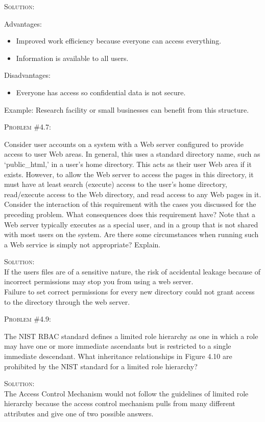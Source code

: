 \documentclass[12pt]{article}
\newenvironment{problem}[1]
{\begin{mdframed}[linewidth=0.8pt]
        \textsc{Problem #1:}

}
    {\end{mdframed}}
\newenvironment{solution}
    {\textsc{Solution:}\\}
    {\newpage}%
\begin{document}
\begin{solution}
\begin{enumerate}
				Advantages:
				\begin{itemize}
					\item Improved work efficiency because everyone can access everything.
					\item Information is available to all users.
				\end{itemize}
				Disadvantages:
				\begin{itemize}
					\item Everyone has access so confidential data is not secure.
				\end{itemize}
				Example: Research facility or small businesses can benefit from this structure.
		\end{enumerate}
	\end{solution}

	\begin{problem}{\#4.7}
		Consider user accounts on a system with a Web server configured to provide access
		to user Web areas. In general, this uses a standard directory name, such as
		`public\_html,' in a user's home directory. This acts as their user Web area if it
		exists. However, to allow the Web server to access the pages in this directory, it
		must have at least search (execute) access to the user's home directory,
		read/execute access to the Web directory, and read access to any Web pages in it.
		Consider the interaction of this requirement with the cases you discussed for the
		preceding problem. What consequences does this requirement have? Note that a Web
		server typically executes as a special user, and in a group that is not shared
		with most users on the system. Are there some circumstances when running such a
		Web service is simply not appropriate? Explain.
	\end{problem}
	\begin{solution}
		If the users files are of a sensitive nature, the risk of accidental leakage because
		of incorrect permissions may stop you from using a web server.\\
		Failure to set correct permissions for every new directory could not grant access
		to the directory through the web server.
	\end{solution}

	\begin{problem}{\#4.9}
		The NIST RBAC standard defines a limited role hierarchy as one in which a role
		may have one or more immediate ascendants but is restricted to a single immediate
		descendant. What inheritance relationships in Figure 4.10 are prohibited by the
		NIST standard for a limited role hierarchy?
	\end{problem}
	\begin{solution}
		The Access Control Mechanism would not follow the guidelines of limited
		role hierarchy because the access control mechanism pulls from many
		different attributes and give one of two possible answers.
	\end{solution}
\end{document}
